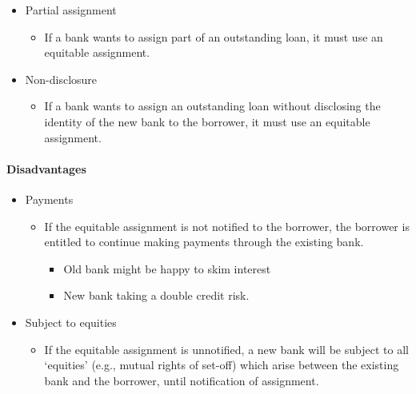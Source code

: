 \documentclass[
]{article}
\providecommand{\tightlist}{%
  \setlength{\itemsep}{0pt}\setlength{\parskip}{0pt}}
\begin{document}
\begin{itemize}
\tightlist
\item
  Partial assignment

  \begin{itemize}
  \tightlist
  \item
    If a bank wants to assign part of an outstanding loan, it must use
    an equitable assignment.
  \end{itemize}
\item
  Non-disclosure

  \begin{itemize}
  \tightlist
  \item
    If a bank wants to assign an outstanding loan without disclosing the
    identity of the new bank to the borrower, it must use an equitable
    assignment.
  \end{itemize}
\end{itemize}

\hypertarget{disadvantages-2}{%
\paragraph{Disadvantages}\label{disadvantages-2}}

\begin{itemize}
\tightlist
\item
  Payments

  \begin{itemize}
  \tightlist
  \item
    If the equitable assignment is not notified to the borrower, the
    borrower is entitled to continue making payments through the
    existing bank.

    \begin{itemize}
    \tightlist
    \item
      Old bank might be happy to skim interest
    \item
      New bank taking a double credit risk.
    \end{itemize}
  \end{itemize}
\item
  Subject to equities

  \begin{itemize}
  \tightlist
  \item
    If the equitable assignment is unnotified, a new bank will be
    subject to all `equities' (e.g., mutual rights of set-off) which
    arise between the existing bank and the borrower, until notification
    of assignment.
  \end{itemize}
\end{itemize}
\end{document}

